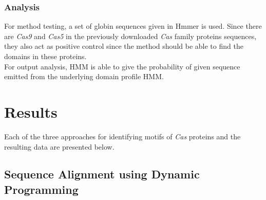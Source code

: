 \documentclass[11pt, oneside]{article}
\begin{document}
\subsubsection{Analysis}
For method testing, a set of globin sequences given in Hmmer\cite{hmmer} is used. Since there are \textit{Cas9} and \textit{Cas5} in the previously downloaded \textit{Cas} family proteins sequences, they also act as positive control since the method should be able to find the domains in these proteins.\\
For output analysis, HMM is able to give the probability of given sequence emitted from the underlying domain profile HMM.





\section{Results}

Each of the three approaches for identifying motifs of \textit{Cas} proteins and the resulting data are presented below. 


\subsection{Sequence Alignment using Dynamic Programming}
\end{document}
